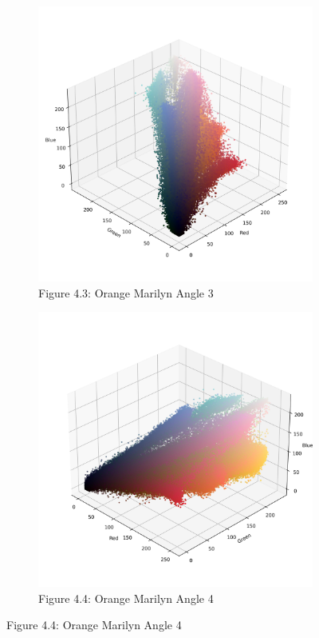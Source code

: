 \documentclass{article}
\begin{document}
\begin{figure}[ht]
  \vspace{1em}
  
  \begin{subfigure}{0.45\textwidth}
    \centering
    \includegraphics[width=\textwidth]{main_files/figure-latex/4_3_orange_marilyn_original_scatter.jpg}
    \caption{Figure 4.3: Orange Marilyn Angle 3}
    \label{fig:4_3_orange_marilyn_original_scatter}
  \end{subfigure}
  \hfill
  \begin{subfigure}{0.45\textwidth}
    \centering
    \includegraphics[width=\textwidth]{main_files/figure-latex/4_4_orange_marilyn_original_scatter.jpg}
    \caption{Figure 4.4: Orange Marilyn Angle 4}
    \label{fig:4_4_orange_marilyn_original_scatter}
  \end{subfigure}
  

\end{figure}
\end{document}
